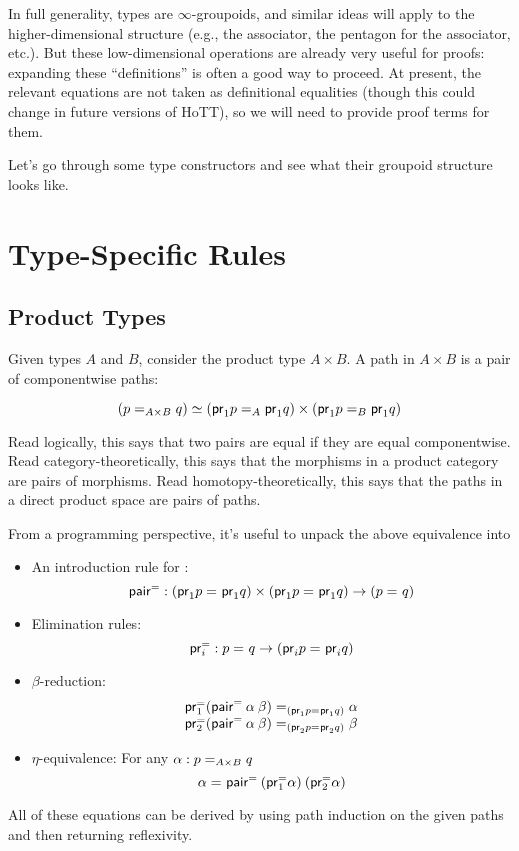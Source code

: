 In full generality, types are $\infty$-groupoids, and similar ideas will
apply to the higher-dimensional structure (e.g., the associator, the
pentagon for the associator, etc.).  But these low-dimensional
operations are already very useful for proofs: expanding these
``definitions'' is often a good way to proceed.  At present, the
relevant equations are not taken as definitional equalities (though this
could change in future versions of HoTT), so we will need to provide
proof terms for them.  

Let's go through some type constructors and see what their groupoid
structure looks like.

\section{Type-Specific Rules}

\subsection{Product Types}

Given types $A$ and $B$, consider the product type $A \times B$.  
A path in $A \times B$ is a pair of componentwise paths:

\[
\eqv{(\id[A \times B] p q)}{(\id[A]{\proj{1} p}{\proj{1} q}) \times (\id[B]{\proj{1} p}{\proj{1} q})}
\]

Read logically, this says that two pairs are equal if they are equal
componentwise.  Read category-theoretically, this says that the
morphisms in a product category are pairs of morphisms.  Read
homotopy-theoretically, this says that the paths in a direct product
space are pairs of paths.  

From a programming perspective, it's useful to unpack the above
equivalence into 

\newcommand{\pairpath}{\mathsf{pair}^{\mathord{=}}}
\newcommand{\projpath}[1]{\proj{#1}^{\mathord{=}}}

\begin{itemize}
\item An introduction rule for :
  \[
  \pairpath : (\id{\proj{1} p}{\proj{1} q}) \times (\id{\proj{1} p}{\proj{1} q}) \to {(\id p q)}
  \]
\item Elimination rules:
  \[
  \projpath{i} : \id{p}{q} \to (\id{\proj{i} p}{\proj{i} q})
  \]
\item $\beta$-reduction:
  \[
  \begin{array}{l}
  \id[(\id{\proj{1} p}{\proj{1} q})]
       {\projpath{1}{(\pairpath \: \alpha \: \beta})}
       {\alpha} \\
  \id[(\id{\proj{2} p}{\proj{2} q})]
       {\projpath{2}{(\pairpath \: \alpha \: \beta})}
       {\beta}
  \end{array}
  \]
\item $\eta$-equivalence: For any $\alpha : \id[A \times B] p q$
  \[
  \id{\alpha}{\pairpath \: (\projpath{1} \alpha) \: (\projpath{2} \alpha) }
  \]
\end{itemize}
All of these equations can be derived by using path induction on the given
paths and then returning reflexivity.  

